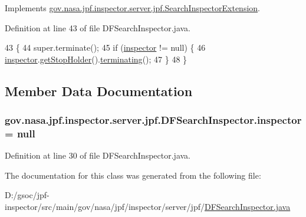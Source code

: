 Implements \hyperlink{interfacegov_1_1nasa_1_1jpf_1_1inspector_1_1server_1_1jpf_1_1_search_inspector_extension_a681234426cc73a32683716de6aa68490}{gov.\+nasa.\+jpf.\+inspector.\+server.\+jpf.\+Search\+Inspector\+Extension}.



Definition at line 43 of file D\+F\+Search\+Inspector.\+java.


\begin{DoxyCode}
43                            \{
44     super.terminate();
45     \textcolor{keywordflow}{if} (\hyperlink{classgov_1_1nasa_1_1jpf_1_1inspector_1_1server_1_1jpf_1_1_d_f_search_inspector_ad69f2b0807d745d900c8e341351d8469}{inspector} != null) \{
46       \hyperlink{classgov_1_1nasa_1_1jpf_1_1inspector_1_1server_1_1jpf_1_1_d_f_search_inspector_ad69f2b0807d745d900c8e341351d8469}{inspector}.\hyperlink{classgov_1_1nasa_1_1jpf_1_1inspector_1_1server_1_1jpf_1_1_j_p_f_inspector_ae952010e74e90389ddb3cef055a0d592}{getStopHolder}().\hyperlink{classgov_1_1nasa_1_1jpf_1_1inspector_1_1server_1_1jpf_1_1_stop_holder_aa7cffa6127510e49385ce5dce81b1878}{terminating}();
47     \}
48   \}
\end{DoxyCode}


\subsection{Member Data Documentation}
\subsubsection[{\texorpdfstring{inspector}{inspector}}]{ gov.\+nasa.\+jpf.\+inspector.\+server.\+jpf.\+D\+F\+Search\+Inspector.\+inspector = null\hspace{0.3cm}{\ttfamily [private]}}\hypertarget{classgov_1_1nasa_1_1jpf_1_1inspector_1_1server_1_1jpf_1_1_d_f_search_inspector_ad69f2b0807d745d900c8e341351d8469}{}\label{classgov_1_1nasa_1_1jpf_1_1inspector_1_1server_1_1jpf_1_1_d_f_search_inspector_ad69f2b0807d745d900c8e341351d8469}


Definition at line 30 of file D\+F\+Search\+Inspector.\+java.



The documentation for this class was generated from the following file\+:\begin{DoxyCompactItemize}
\item 
D\+:/gsoc/jpf-\/inspector/src/main/gov/nasa/jpf/inspector/server/jpf/\hyperlink{_d_f_search_inspector_8java}{D\+F\+Search\+Inspector.\+java}\end{DoxyCompactItemize}
